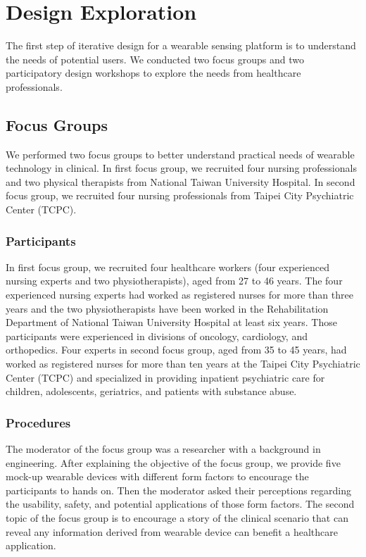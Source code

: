 \chapter{Design Exploration}

The first step of iterative design for a wearable sensing platform is to understand the needs of potential users. We conducted two focus groups and two participatory design workshops to explore the needs from healthcare professionals.

\section{Focus Groups}
We performed two focus groups to better understand practical needs of wearable technology in clinical. In first focus group, we recruited four nursing professionals and two physical therapists from National Taiwan University Hospital. In second focus group, we recruited four nursing professionals from Taipei City Psychiatric Center (TCPC).

\subsection{Participants}
In first focus group, we recruited four healthcare workers (four experienced nursing experts and two physiotherapists), aged from 27 to 46 years. The four experienced nursing experts had worked as registered nurses for more than three years and the two physiotherapists have been worked in the Rehabilitation Department of National Taiwan University Hospital at least six years. Those participants were experienced in divisions of oncology, cardiology, and orthopedics.
Four experts in second focus group, aged from 35 to 45 years, had worked as registered nurses for more than ten years at the Taipei City Psychiatric Center (TCPC) and specialized in providing inpatient psychiatric care for children, adolescents, geriatrics, and patients with substance abuse.

\subsection{Procedures}
The moderator of the focus group was a researcher with a background in engineering. After explaining the objective of the focus group, we provide five mock-up wearable devices with different form factors to encourage the participants to hands on. Then the moderator asked their perceptions regarding the usability, safety, and potential applications of those form factors. The second topic of the focus group is to encourage a story of the clinical scenario that can reveal any information derived from wearable device can benefit a healthcare application.

